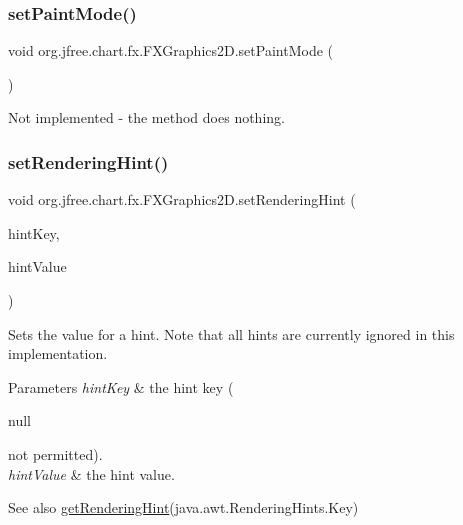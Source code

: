 \subsubsection{\texorpdfstring{set\+Paint\+Mode()}{setPaintMode()}}
{\footnotesize\ttfamily void org.\+jfree.\+chart.\+fx.\+F\+X\+Graphics2\+D.\+set\+Paint\+Mode (\begin{DoxyParamCaption}{ }\end{DoxyParamCaption})}

Not implemented -\/ the method does nothing. \mbox{\label{classorg_1_1jfree_1_1chart_1_1fx_1_1_f_x_graphics2_d_a727f4c6a3f846b60dd33bfd933e3c812}} 
\subsubsection{\texorpdfstring{set\+Rendering\+Hint()}{setRenderingHint()}}
{\footnotesize\ttfamily void org.\+jfree.\+chart.\+fx.\+F\+X\+Graphics2\+D.\+set\+Rendering\+Hint (\begin{DoxyParamCaption}\item[{Rendering\+Hints.\+Key}]{hint\+Key,  }\item[{Object}]{hint\+Value }\end{DoxyParamCaption})}

Sets the value for a hint. Note that all hints are currently ignored in this implementation.


\begin{DoxyParams}{Parameters}
{\em hint\+Key} & the hint key (
\begin{DoxyCode}
null 
\end{DoxyCode}
 not permitted). \\
\hline
{\em hint\+Value} & the hint value.\\
\hline
\end{DoxyParams}
\begin{DoxySeeAlso}{See also}
\mbox{\hyperlink{classorg_1_1jfree_1_1chart_1_1fx_1_1_f_x_graphics2_d_afa793efe72f1ae21a3c9b9c10927ca31}{get\+Rendering\+Hint}}(java.\+awt.\+Rendering\+Hints.\+Key) 
\end{DoxySeeAlso}
\mbox{\label{classorg_1_1jfree_1_1chart_1_1fx_1_1_f_x_graphics2_d_aeb0a99279a4b73ea5e5a4eb298c645d3}} 
